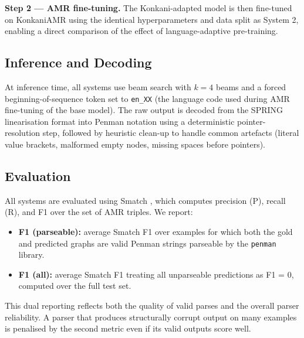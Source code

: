 \textbf{Step 2 — AMR fine-tuning.} The Konkani-adapted model is then fine-tuned on KonkaniAMR using the identical hyperparameters and data split as System 2, enabling a direct comparison of the effect of language-adaptive pre-training.

\subsection{Inference and Decoding}

At inference time, all systems use beam search with $k=4$ beams and a forced beginning-of-sequence token set to \texttt{en\_XX} (the language code used during AMR fine-tuning of the base model). The raw output is decoded from the SPRING linearisation format into Penman notation using a deterministic pointer-resolution step, followed by heuristic clean-up to handle common artefacts (literal value brackets, malformed empty nodes, missing spaces before pointers).

\subsection{Evaluation}

All systems are evaluated using Smatch \cite{cai2013smatch}, which computes precision (P), recall (R), and F1 over the set of AMR triples. We report:
\begin{itemize}
    \item \textbf{F1 (parseable):} average Smatch F1 over examples for which both the gold and predicted graphs are valid Penman strings parseable by the \texttt{penman} library.
    \item \textbf{F1 (all):} average Smatch F1 treating all unparseable predictions as F1 = 0, computed over the full test set.
\end{itemize}
This dual reporting reflects both the quality of valid parses and the overall parser reliability. A parser that produces structurally corrupt output on many examples is penalised by the second metric even if its valid outputs score well.
